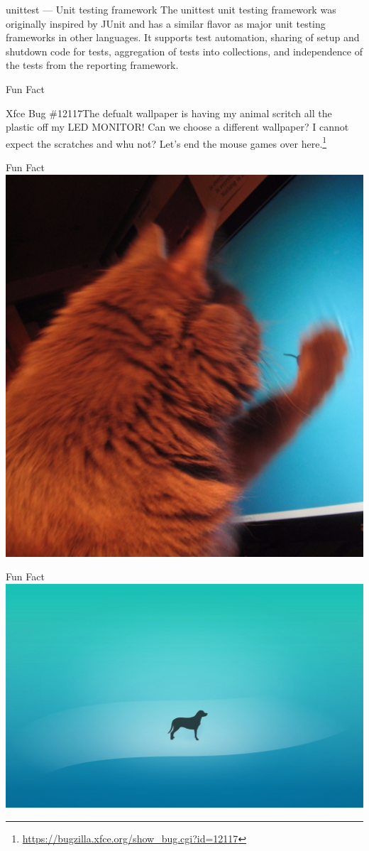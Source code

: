 \documentclass{beamer}
\begin{document}
\begin{frame}[t]{unittest --- Unit testing framework}
The unittest unit testing framework was originally inspired by JUnit and has a similar flavor as major unit testing frameworks in other languages. It supports test automation, sharing of setup and shutdown code for tests, aggregation of tests into collections, and independence of the tests from the reporting framework.
\end{frame}
\begin{frame}[t]{Fun Fact}
	\begin{block}
		{Xfce Bug \#12117}The defualt wallpaper is having my animal scritch all the plastic off my LED MONITOR! Can we choose a different wallpaper? I cannot expect the scratches and whu not? Let's end the mouse games over here.\footnote{\url{https://bugzilla.xfce.org/show_bug.cgi?id=12117}}
		
	\end{block}
	
\end{frame}
\begin{frame}[t]{Fun Fact}
	\centering
	\includegraphics[width=0.5\linewidth]{images/cat-xfce-bug-2.jpg}
	
\end{frame}
\begin{frame}[t]{Fun Fact}
	\includegraphics[width=0.8\linewidth]{images/patched-wallpaper.jpg}
	
\end{frame}
\end{document}
